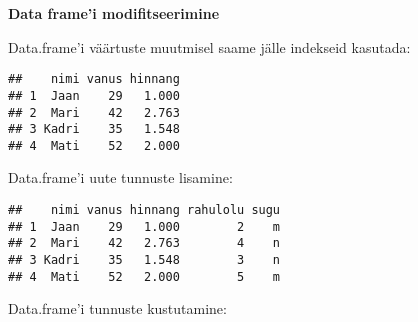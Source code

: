 \documentclass[
]{book}
\newenvironment{Shaded}{\begin{snugshade}}{\end{snugshade}}
\newcommand{\CommentTok}[1]{\textcolor[rgb]{0.56,0.35,0.01}{\textit{#1}}}
\newcommand{\ConstantTok}[1]{\textcolor[rgb]{0.00,0.00,0.00}{#1}}
\newcommand{\DecValTok}[1]{\textcolor[rgb]{0.00,0.00,0.81}{#1}}
\newcommand{\FunctionTok}[1]{\textcolor[rgb]{0.00,0.00,0.00}{#1}}
\newcommand{\NormalTok}[1]{#1}
\newcommand{\OtherTok}[1]{\textcolor[rgb]{0.56,0.35,0.01}{#1}}
\newcommand{\SpecialCharTok}[1]{\textcolor[rgb]{0.00,0.00,0.00}{#1}}
\newcommand{\StringTok}[1]{\textcolor[rgb]{0.31,0.60,0.02}{#1}}
\begin{document}
\textbf{Data frame'i modifitseerimine}

Data.frame'i väärtuste muutmisel saame jälle indekseid kasutada:

\begin{Shaded}
\end{Shaded}

\begin{verbatim}
##    nimi vanus hinnang
## 1  Jaan    29   1.000
## 2  Mari    42   2.763
## 3 Kadri    35   1.548
## 4  Mati    52   2.000
\end{verbatim}

Data.frame'i uute tunnuste lisamine:

\begin{Shaded}
\end{Shaded}

\begin{verbatim}
##    nimi vanus hinnang rahulolu sugu
## 1  Jaan    29   1.000        2    m
## 2  Mari    42   2.763        4    n
## 3 Kadri    35   1.548        3    n
## 4  Mati    52   2.000        5    m
\end{verbatim}

Data.frame'i tunnuste kustutamine:

\begin{Shaded}
\end{Shaded}
\end{document}
